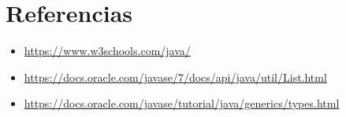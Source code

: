 \documentclass{article}
\begin{document}
\clearpage		
\section{Referencias}
\begin{itemize}			
	\item \url{https://www.w3schools.com/java/}
	\item \url{https://docs.oracle.com/javase/7/docs/api/java/util/List.html}
	\item \url{https://docs.oracle.com/javase/tutorial/java/generics/types.html}

\end{itemize}	

	
%
%
%
			
\end{document}
